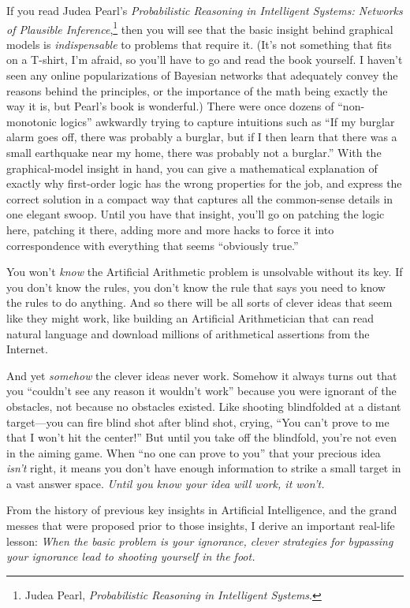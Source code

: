  If you read Judea Pearl's \textit{Probabilistic
Reasoning in Intelligent Systems: Networks of Plausible
Inference},\footnote{Judea Pearl, \textit{Probabilistic Reasoning in Intelligent
Systems}.} then you will see that the basic insight
behind graphical models is \textit{indispensable} to problems that
require it. (It's not something that fits on a T-shirt,
I'm afraid, so you'll have to go and
read the book yourself. I haven't seen any online
popularizations of Bayesian networks that adequately convey the reasons
behind the principles, or the importance of the math being exactly the
way it is, but Pearl's book is wonderful.) There were
once dozens of ``non-monotonic
logics'' awkwardly trying to capture intuitions such
as ``If my burglar alarm goes off, there was probably
a burglar, but if I then learn that there was a small earthquake near
my home, there was probably not a burglar.'' With the
graphical-model insight in hand, you can give a mathematical
explanation of exactly why first-order logic has the wrong properties
for the job, and express the correct solution in a compact way that
captures all the common-sense details in one elegant swoop. Until you
have that insight, you'll go on patching the logic
here, patching it there, adding more and more hacks to force it into
correspondence with everything that seems ``obviously
true.''


 You won't \textit{know} the Artificial Arithmetic
problem is unsolvable without its key. If you don't
know the rules, you don't know the rule that says you
need to know the rules to do anything. And so there will be all sorts
of clever ideas that seem like they might work, like building an
Artificial Arithmetician that can read natural language and download
millions of arithmetical assertions from the Internet.

{
 And yet \textit{somehow} the clever ideas never work. Somehow it
always turns out that you ``couldn't
see any reason it wouldn't work''
because you were ignorant of the obstacles, not because no obstacles
existed. Like shooting blindfolded at a distant target---you can fire
blind shot after blind shot, crying, ``You
can't prove to me that I won't hit the
center!'' But until you take off the blindfold,
you're not even in the aiming game. When
``no one can prove to you'' that
your precious idea \textit{isn't} right, it means you
don't have enough information to strike a small target
in a vast answer space. \textit{Until you know your idea will work, it
won't.}}

{
 From the history of previous key insights in Artificial
Intelligence, and the grand messes that were proposed prior to those
insights, I derive an important real-life lesson: \textit{When the
basic problem is your ignorance, clever strategies for bypassing your
ignorance lead to shooting yourself in the foot.}}

